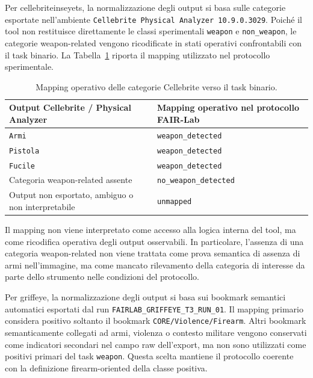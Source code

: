 Per \gls{cellebriteinseyets}, la normalizzazione degli output si basa sulle
categorie esportate nell'ambiente \texttt{Cellebrite Physical Analyzer
10.9.0.3029}. Poiché il tool non restituisce direttamente le classi sperimentali
\texttt{weapon} e \texttt{non\_weapon}, le categorie weapon-related vengono
ricodificate in stati operativi confrontabili con il task binario. La
Tabella~\ref{tab:methodology-cellebrite-mapping} riporta il mapping utilizzato
nel protocollo sperimentale.

\begin{table}[H]
\centering
\caption{Mapping operativo delle categorie Cellebrite verso il task binario.}
\label{tab:methodology-cellebrite-mapping}
\footnotesize
\renewcommand{\arraystretch}{1.15}
\begin{tabularx}{0.90\textwidth}{@{}p{}X@{}}
\toprule
\textbf{Output Cellebrite / Physical Analyzer} &
\textbf{Mapping operativo nel protocollo FAIR-Lab} \\
\midrule
\texttt{Armi}
& \texttt{weapon\_detected} \\

\texttt{Pistola}
& \texttt{weapon\_detected} \\

\texttt{Fucile}
& \texttt{weapon\_detected} \\

Categoria weapon-related assente
& \texttt{no\_weapon\_detected} \\

Output non esportato, ambiguo o non interpretabile
& \texttt{unmapped} \\
\bottomrule
\end{tabularx}
\end{table}

Il mapping non viene interpretato come accesso alla logica interna del tool, ma
come ricodifica operativa degli output osservabili. In particolare, l'assenza di
una categoria weapon-related non viene trattata come prova semantica di assenza
di armi nell'immagine, ma come mancato rilevamento della categoria di interesse
da parte dello strumento nelle condizioni del protocollo.


Per \gls{griffeye}, la normalizzazione degli output si basa sui bookmark
semantici automatici esportati dal run \texttt{FAIRLAB\_GRIFFEYE\_T3\_RUN\_01}.
Il mapping primario considera positivo soltanto il bookmark
\texttt{CORE/Violence/Firearm}. Altri bookmark semanticamente collegati ad armi,
violenza o contesto militare vengono conservati come indicatori secondari nel
campo raw dell'export, ma non sono utilizzati come positivi primari del task
\texttt{weapon}. Questa scelta mantiene il protocollo coerente con la definizione
firearm-oriented della classe positiva.

